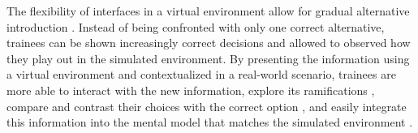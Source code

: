 The flexibility of interfaces in a virtual environment allow for gradual alternative introduction \citep{Ericsson1993}. Instead of being confronted with only one correct alternative, trainees can be shown increasingly correct decisions and allowed to observed how they play out in the simulated environment. By presenting the information using a virtual environment and contextualized in a real-world scenario, trainees are more able to interact with the new information, explore its ramifications \citep{Ericsson1993, Patterson2010}, compare and contrast their choices with the correct option \citep{Fowlkes2009}, and easily integrate this information into the mental model that matches the simulated environment \citep{Salzman1999}.
